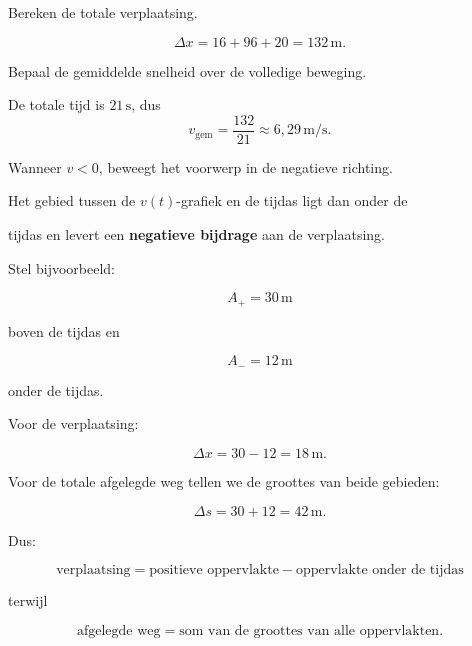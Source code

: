 \documentclass{ximera}
\begin{document}
\begin{oefening}{\oefU\ESS}
\begin{question}

Bereken de totale verplaatsing.

\begin{oplossing}
\[\Delta x=16+96+20=132\,\mathrm{m}.\]
\end{oplossing}

\end{question}

\begin{question}

Bepaal de gemiddelde snelheid over de volledige beweging.

\begin{oplossing}
De totale tijd is \(21\,\mathrm{s}\), dus
\[v_{\mathrm{gem}}=\frac{132}{21}\approx6,29\,\mathrm{m/s}.\]
\end{oplossing}

\end{question}

\end{oefening}


Wanneer $v<0$, beweegt het voorwerp in de negatieve richting.

Het gebied tussen de $v(t)$-grafiek en de tijdas ligt dan onder de

tijdas en levert een \textbf{negatieve bijdrage} aan de verplaatsing.

Stel bijvoorbeeld:

\[A_+=30\,\mathrm{m}\]

boven de tijdas en

\[A_-=12\,\mathrm{m}\]

onder de tijdas.

Voor de verplaatsing:

\[\Delta x=30-12=18\,\mathrm{m}.\]

Voor de totale afgelegde weg tellen we de groottes van beide gebieden:

\[\Delta s=30+12=42\,\mathrm{m}.\]

Dus:

\[\boxed{ \text{verplaatsing} = \text{positieve oppervlakte} - \text{oppervlakte onder de tijdas} }\]

terwijl

\[\boxed{ \text{afgelegde weg} = \text{som van de groottes van alle oppervlakten}. }\]
\end{document}
